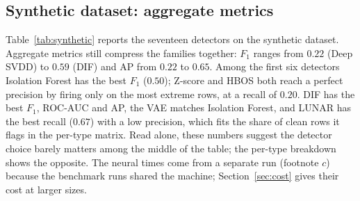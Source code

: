 \documentclass[conference]{IEEEtran}
\begin{document}
\subsection{Synthetic dataset: aggregate metrics}
Table~\ref{tab:synthetic} reports the seventeen detectors on the synthetic
dataset. Aggregate metrics still compress the families together: $F_1$
ranges from $0.22$ (Deep SVDD) to $0.59$ (DIF) and AP from $0.22$ to
$0.65$. Among the first six detectors Isolation Forest has the best $F_1$
($0.50$); Z-score and HBOS both reach a perfect precision by firing only on
the most extreme rows, at a recall of $0.20$. DIF has the best $F_1$, ROC-AUC
and AP, the VAE matches Isolation Forest, and LUNAR has the best recall
($0.67$) with a low precision, which fits the share of clean rows it flags
in the per-type matrix. Read alone, these numbers suggest the detector choice
barely matters among the middle of the table; the per-type breakdown shows
the opposite. The neural times come from a separate run (footnote $c$) because the benchmark
runs shared the machine; Section~\ref{sec:cost} gives their cost at larger sizes.
\end{document}
